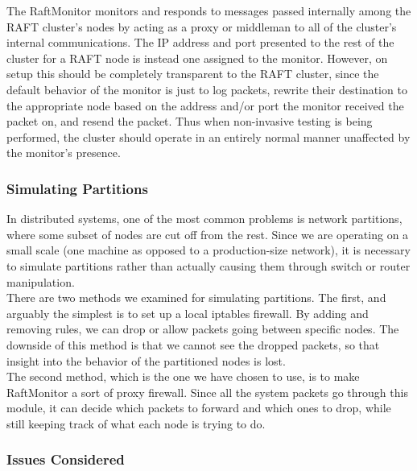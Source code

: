\documentclass[UTF8]{article}
\begin{document}
The RaftMonitor monitors and responds to messages passed internally among the RAFT cluster's nodes by acting as a proxy or middleman to all of the cluster's internal communications. The IP address and port presented to the rest of the cluster for a RAFT node is instead one assigned to the monitor. However, on setup this should be completely transparent to the RAFT cluster, since the default behavior of the monitor is just to log packets, rewrite their destination to the appropriate node based on the address and/or port the monitor received the packet on, and resend the packet. Thus when non-invasive testing is being performed, the cluster should operate in an entirely normal manner unaffected by the monitor's presence.


\subsubsection{Simulating Partitions}

In distributed systems, one of the most common problems is network partitions, where some subset of nodes are cut off from the rest. Since we are operating on a small scale (one machine as opposed to a production-size network), it is necessary to simulate partitions rather than actually causing them through switch or router manipulation.
\\ \indent There are two methods we examined for simulating partitions. The first, and arguably the simplest is to set up a local iptables firewall. By adding and removing rules, we can drop or allow packets going between specific nodes. The downside of this method is that we cannot see the dropped packets, so that insight into the behavior of the partitioned nodes is lost.
\\ \indent The second method, which is the one we have chosen to use, is to make RaftMonitor a sort of proxy firewall. Since all the system packets go through this module, it can decide which packets to forward and which ones to drop, while still keeping track of what each node is trying to do.

\subsubsection{Issues Considered}
\end{document}
